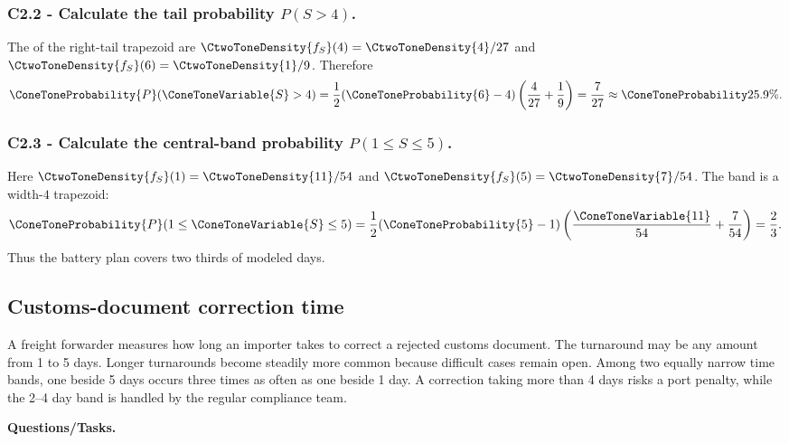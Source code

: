 \subsubsection*{C2.2 - Calculate the tail probability $P(S>4)$.}
\label{subsec:c2-linear-microgrid-b}
The   of the right-tail trapezoid are
$\CtwoToneDensity{f_S}(4)=\CtwoToneDensity{4}/27$ and $\CtwoToneDensity{f_S}(6)=\CtwoToneDensity{1}/9$.  Therefore
\[
 \ConeToneProbability{P}(\ConeToneVariable{S}>4)=\frac12(\ConeToneProbability{6}-4)\left(\frac4{27}+\frac19\right)
 =\frac7{27}\approx\ConeToneProbability{25.9\%}.
\]

\subsubsection*{C2.3 - Calculate the central-band probability
$P(1\le S\le5)$.}
\label{subsec:c2-linear-microgrid-c}
Here $\CtwoToneDensity{f_S}(1)=\CtwoToneDensity{11}/54$ and $\CtwoToneDensity{f_S}(5)=\CtwoToneDensity{7}/54$.  The band is a width-$4$
trapezoid:
\[
 \ConeToneProbability{P}(1\le \ConeToneVariable{S}\le5)=\frac12(\ConeToneProbability{5}-1)\left(\frac{\ConeToneVariable{11}}{54}+\frac7{54}\right)
 =\frac23.
\]
Thus the battery plan covers two thirds of modeled days.

\subsection{Customs-document correction time}\label{sec:c2-linear-customs}
A freight forwarder measures how long an importer takes to correct a rejected
customs document.  The turnaround may be any amount from 1 to 5 days.  Longer
turnarounds become steadily more common because difficult cases remain open.
Among two equally narrow time bands, one beside 5 days occurs three times as
often as one beside 1 day.  A correction taking more than 4 days risks a port
penalty, while the 2--4 day band is handled by the regular compliance team.

\begingroup{}
\endgroup

\textbf{Questions/Tasks.}
\begin{enumerate}
\end{enumerate}

